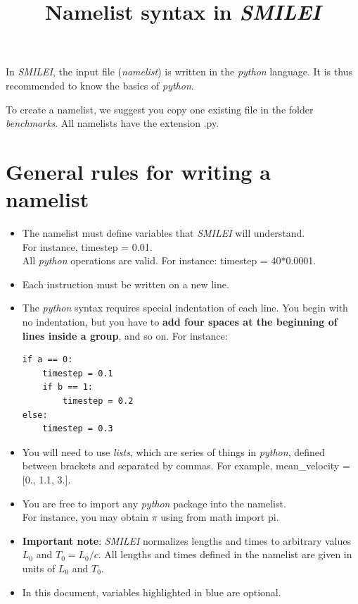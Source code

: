 \documentclass[11pt]{article}
\newcommand{\code}[1]{\colorbox{yellow!15}{\ttfamily #1}}
\newcommand{\blue}[1]{{\color{blue} #1}}
\newcommand{\python}{\emph{python}\xspace}
\newcommand{\smilei}{\emph{SMILEI}\xspace}
\begin{document}
\vfill

\title{Namelist syntax in \smilei}
\maketitle

\vfill

In \smilei, the input file (\emph{namelist}) is written in the \python  language.
It is thus recommended to know the basics of \python.

To create a namelist, we suggest you copy one existing file in the folder \emph{benchmarks}. All namelists have the extension \code{.py}.

\vfill
\begingroup
\setlength{\parskip}{0pt}
\setcounter{tocdepth}{2}
\tableofcontents
\endgroup
\vfill

\clearpage



\section{General rules for writing a namelist}

\begin{itemize}
\item The namelist must define variables that \smilei will understand.\\
For instance, \code{timestep = 0.01}.\\
All \python operations are valid. For instance: \code{timestep = 40*0.0001}.

\item Each instruction must be written on a new line.

\item The \python syntax requires special indentation of each line. You begin with no indentation,
but you have to \textbf{add four spaces at the beginning of lines inside a group}, and so on.
For instance:
\begin{lstlisting}
if a == 0:
    timestep = 0.1
    if b == 1:
        timestep = 0.2
else:
    timestep = 0.3
\end{lstlisting}

\item You will need to use \emph{lists}, which are series of things in \python, defined between brackets \code{[]} and separated by commas. For example, \code{mean\_velocity = [0., 1.1, 3.]}.

\item You are free to import any \python package into the namelist.\\
For instance, you may obtain $\pi$ using \code{from math import pi}.

\item \textbf{Important note}: \smilei normalizes lengths and times to arbitrary values $L_0$ and $T_0 = L_0/c$.  All lengths and times defined in the namelist are given in units of $L_0$ and $T_0$.

\item In this document, variables \blue{highlighted in blue} are optional.

\end{itemize}
\end{document}
